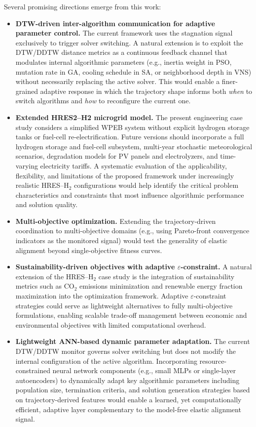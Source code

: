 \documentclass[review]{elsarticle}
\begin{document}
Several promising directions emerge from this work:
\begin{itemize}
    \item \textbf{DTW-driven inter-algorithm communication for adaptive parameter control.} The current framework uses the stagnation signal exclusively to trigger solver switching. A natural extension is to exploit the DTW/DDTW distance metrics as a continuous feedback channel that modulates internal algorithmic parameters (e.g., inertia weight in PSO, mutation rate in GA, cooling schedule in SA, or neighborhood depth in VNS) without necessarily replacing the active solver. This would enable a finer-grained adaptive response in which the trajectory shape informs both \emph{when} to switch algorithms and \emph{how} to reconfigure the current one.
    \item \textbf{Extended HRES2--H2 microgrid model.} The present engineering case study considers a simplified WPEB system without explicit hydrogen storage tanks or fuel-cell re-electrification. Future versions should incorporate a full hydrogen storage and fuel-cell subsystem, multi-year stochastic meteorological scenarios, degradation models for PV panels and electrolyzers, and time-varying electricity tariffs. A systematic evaluation of the applicability, flexibility, and limitations of the proposed framework under increasingly realistic HRES--H$_2$ configurations would help identify the critical problem characteristics and constraints that most influence algorithmic performance and solution quality.
    \item \textbf{Multi-objective optimization.} Extending the trajectory-driven coordination to multi-objective domains (e.g., using Pareto-front convergence indicators as the monitored signal) would test the generality of elastic alignment beyond single-objective fitness curves.
    \item \textbf{Sustainability-driven objectives with adaptive $\varepsilon$-constraint.} A natural extension of the HRES--H$_2$ case study is the integration of sustainability metrics such as CO$_2$ emissions minimization and renewable energy fraction maximization into the optimization framework. Adaptive $\varepsilon$-constraint strategies could serve as lightweight alternatives to fully multi-objective formulations, enabling scalable trade-off management between economic and environmental objectives with limited computational overhead.
    \item \textbf{Lightweight ANN-based dynamic parameter adaptation.} The current DTW/DDTW monitor governs solver switching but does not modify the internal configuration of the active algorithm. Incorporating resource-constrained neural network components (e.g., small MLPs or single-layer autoencoders) to dynamically adapt key algorithmic parameters including population size, termination criteria, and solution generation strategies based on trajectory-derived features would enable a learned, yet computationally efficient, adaptive layer complementary to the model-free elastic alignment signal.
\end{itemize}
\end{document}
